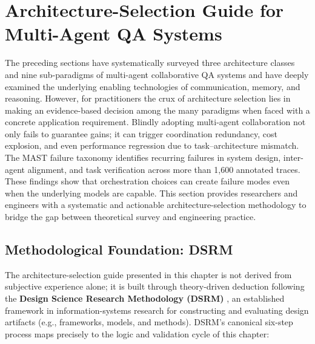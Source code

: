 \section{Architecture-Selection Guide for Multi-Agent QA Systems}
\label{sec:guideline}

The preceding sections have systematically surveyed three architecture
classes and nine sub-paradigms of multi-agent collaborative QA systems
and have deeply examined the underlying enabling technologies of
communication, memory, and reasoning.
However, for practitioners the crux of architecture selection lies in
making an evidence-based decision among the many paradigms when faced with
a concrete application requirement.
Blindly adopting multi-agent collaboration not only fails to guarantee
gains; it can trigger coordination redundancy, cost explosion, and even
performance regression due to task--architecture mismatch.
The MAST failure taxonomy \citep{han2024mast} identifies recurring failures
in system design, inter-agent alignment, and task verification across more
than 1,600 annotated traces. These findings show that orchestration choices
can create failure modes even when the underlying models are capable.
This section provides researchers and engineers with a systematic and
actionable architecture-selection methodology to bridge the gap between
theoretical survey and engineering practice.

\subsection{Methodological Foundation: DSRM}
\label{sec:dsrm}

The architecture-selection guide presented in this chapter is not derived
from subjective experience alone; it is built through theory-driven
deduction following the \textbf{Design Science Research Methodology (DSRM)}
\citep{peffers2007dsrm}, an established framework in information-systems
research for constructing and evaluating design artifacts (e.g., frameworks,
models, and methods).
DSRM's canonical six-step process maps precisely to the logic and
validation cycle of this chapter:

